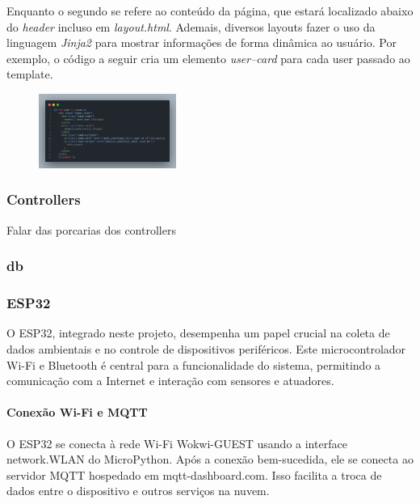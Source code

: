 \documentclass[conference, a4paper, 12pt]{IEEEtran}
\begin{document}
      Enquanto o segundo se refere ao conteúdo da página, que estará localizado abaixo do \emph{header} incluso em \emph{layout.html}. Ademais, diversos layouts fazer o uso da linguagem \emph{Jinja2} para mostrar informações de forma dinâmica ao usuário. Por exemplo, o código a seguir cria um elemento \emph{user--card} para cada user passado ao template.

      \begin{figure}[h]
        \begin{center}
          \includegraphics[width=0.40\textwidth]{user-card.png}
        \end{center}
      \end{figure}



\subsubsection{Controllers}
Falar das porcarias dos controllers
\subsubsection{db}
\subsubsection{ESP32}
O ESP32, integrado neste projeto, desempenha um papel crucial na coleta de dados ambientais e no controle de dispositivos periféricos. Este microcontrolador Wi-Fi e Bluetooth é central para a funcionalidade do sistema, permitindo a comunicação com a Internet e interação com sensores e atuadores.

\paragraph{Conexão Wi-Fi e MQTT}
O ESP32 se conecta à rede Wi-Fi Wokwi-GUEST usando a interface network.WLAN do MicroPython. Após a conexão bem-sucedida, ele se conecta ao servidor MQTT hospedado em mqtt-dashboard.com. Isso facilita a troca de dados entre o dispositivo e outros serviços na nuvem.
\end{document}
